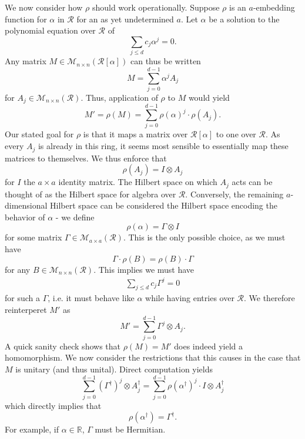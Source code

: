 \documentclass{article}
\theoremstyle{definition}
\theoremstyle{theorem}
\theoremstyle{remark}
\begin{document}
	We now consider how $\rho$ should work operationally. Suppose $\rho$ is an $a$-embedding function for $\alpha$ in $\mathcal{R}$ for an as yet undetermined $a$. Let $\alpha$ be a solution to the polynomial equation over $\mathcal{R}$ of 
	\[
		\sum_{j\leq d} c_j \alpha^j = 0.
	\]
	Any matrix $M\in\mathcal{M}_{n\times n}(\mathcal{R}[\alpha])$ can thus be written
	\[
		M = \sum_{j=0}^{d-1} \alpha^j A_j
	\]
	for $A_j\in\mathcal{M}_{n\times n}(\mathcal{R})$. Thus, application of $\rho$ to $M$ would yield
	\[
		M' = \rho(M) = \sum_{j=0}^{d-1}\rho(\alpha)^j \cdot \rho(A_j).
	\]
	Our stated goal for $\rho$ is that it maps a matrix over $\mathcal{R}[\alpha]$ to one over $\mathcal{R}$. As every $A_j$ is already in this ring, it seems most sensible to essentially map these matrices to themselves. We thus enforce that
	\[
		\rho(A_j) = I\otimes A_j
	\]
	for $I$ the $a\times a$ identity matrix. The Hilbert space on which $A_j$ acts can be thought of as the Hilbert space for algebra over $\mathcal{R}$. Conversely, the remaining $a$-dimensional Hilbert space can be considered the Hilbert space encoding the behavior of $\alpha$ - we define
	\[
		\rho(\alpha) = \Gamma\otimes I
	\]
	for some matrix $\Gamma\in\mathcal{M}_{a\times a}(\mathcal{R})$. This is the only possible choice, as we must have
	\[
		\Gamma\cdot \rho(B) = \rho(B) \cdot\Gamma
	\]
	for any $B\in\mathcal{M}_{n\times n}(\mathcal{R})$. This implies we must have
	\begin{align*}
		\sum_{j\leq d} c_j \Gamma^j = 0
	\end{align*}
	for such a $\Gamma$, i.e. it must behave like $\alpha$ while having entries over $\mathcal{R}$. We therefore reinterperet $M'$ as
	\[
		M' = \sum_{j=0}^{d-1} \Gamma^j \otimes A_j.
	\]
	A quick sanity check shows that $\rho(M)=M'$ does indeed yield a homomorphism. We now consider the restrictions that this causes in the case that $M$ is unitary (and thus unital). Direct computation yields
	\[
		\sum_{j=0}^{d-1} (\Gamma^\dagger)^j\otimes A_j^\dagger = \sum_{j=0}^{d-1} \rho(\alpha^\dagger)^j \cdot I\otimes A_j^\dagger
	\]
	which directly implies that
	\[
		\rho(\alpha^\dagger) = \Gamma^\dagger.
	\]
	For example, if $\alpha\in\mathbb{R}$, $\Gamma$ must be Hermitian.
	
\end{document}
